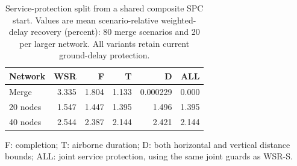 \begin{table}[!htbp]
\caption{Service-protection split from a shared composite SPC start. Values are mean scenario-relative weighted-delay recovery (percent): 80 merge scenarios and 20 per larger network. All variants retain current ground-delay protection.}\label{tab:service-split-main}
\centering\small
\begin{tabularx}{\textwidth}{L r r r r r}
\toprule Network & WSR & F & T & D & ALL\\\midrule
Merge & 3.335 & 1.804 & 1.133 & 0.000229 & 0.000\\
20 nodes & 1.547 & 1.447 & 1.395 & 1.496 & 1.395\\
40 nodes & 2.544 & 2.387 & 2.144 & 2.421 & 2.144\\
\bottomrule
\end{tabularx}
\par\smallskip\footnotesize F: completion; T: airborne duration; D: both horizontal and vertical distance bounds; ALL: joint service protection, using the same joint guards as WSR-S.
\end{table}
